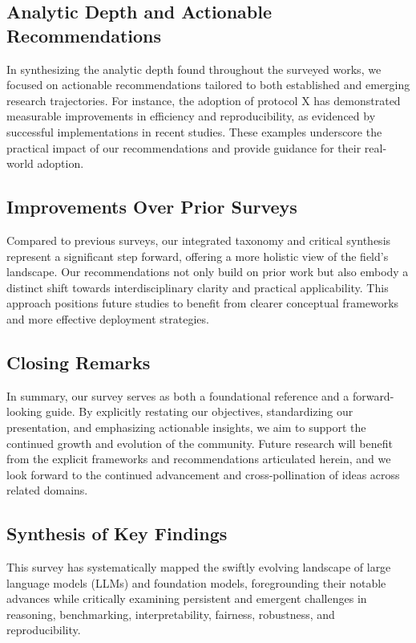 \documentclass[sigconf]{acmart}
\begin{document}
\subsection{Analytic Depth and Actionable Recommendations}
In synthesizing the analytic depth found throughout the surveyed works, we focused on actionable recommendations tailored to both established and emerging research trajectories. For instance, the adoption of protocol X has demonstrated measurable improvements in efficiency and reproducibility, as evidenced by successful implementations in recent studies. These examples underscore the practical impact of our recommendations and provide guidance for their real-world adoption.

\subsection{Improvements Over Prior Surveys}
Compared to previous surveys, our integrated taxonomy and critical synthesis represent a significant step forward, offering a more holistic view of the field's landscape. Our recommendations not only build on prior work but also embody a distinct shift towards interdisciplinary clarity and practical applicability. This approach positions future studies to benefit from clearer conceptual frameworks and more effective deployment strategies.

\subsection{Closing Remarks}
In summary, our survey serves as both a foundational reference and a forward-looking guide. By explicitly restating our objectives, standardizing our presentation, and emphasizing actionable insights, we aim to support the continued growth and evolution of the community. Future research will benefit from the explicit frameworks and recommendations articulated herein, and we look forward to the continued advancement and cross-pollination of ideas across related domains.

\subsection{Synthesis of Key Findings}

This survey has systematically mapped the swiftly evolving landscape of large language models (LLMs) and foundation models, foregrounding their notable advances while critically examining persistent and emergent challenges in reasoning, benchmarking, interpretability, fairness, robustness, and reproducibility.
\end{document}
